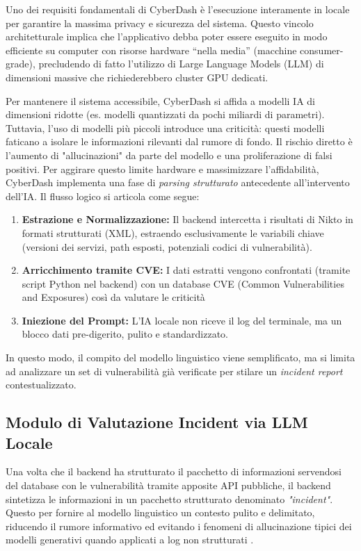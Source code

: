 \documentclass{article}
\begin{document}
Uno dei requisiti fondamentali di CyberDash è l'esecuzione interamente in locale per garantire la massima privacy e sicurezza del sistema. Questo vincolo architetturale implica che l'applicativo debba poter essere eseguito in modo efficiente su computer con risorse hardware ``nella media'' (macchine consumer-grade), precludendo di fatto l'utilizzo di Large Language Models (LLM) di dimensioni massive che richiederebbero cluster GPU dedicati.

Per mantenere il sistema accessibile, CyberDash si affida a modelli IA di dimensioni ridotte (es. modelli quantizzati da pochi miliardi di parametri). Tuttavia, l'uso di modelli più piccoli introduce una criticità: questi modelli faticano a isolare le informazioni rilevanti dal rumore di fondo. Il rischio diretto è l'aumento di "allucinazioni" da parte del modello e una proliferazione di falsi positivi.
Per aggirare questo limite hardware e massimizzare l'affidabilità, CyberDash implementa una fase di \textit{parsing strutturato} antecedente all'intervento dell'IA. Il flusso logico si articola come segue:

\begin{enumerate}
    \item \textbf{Estrazione e Normalizzazione:} Il backend intercetta i risultati di Nikto in formati strutturati (XML), estraendo esclusivamente le variabili chiave (versioni dei servizi, path esposti, potenziali codici di vulnerabilità).
    \item \textbf{Arricchimento tramite CVE:} I dati estratti vengono confrontati (tramite script Python nel backend) con un database CVE (Common Vulnerabilities and Exposures) così da valutare le criticità
    \item \textbf{Iniezione del Prompt:} L'IA locale non riceve il log del terminale, ma un blocco dati pre-digerito, pulito e standardizzato.
\end{enumerate}

In questo modo, il compito del modello linguistico viene semplificato, ma si limita ad analizzare un set di vulnerabilità già verificate per stilare un \textit{incident report} contestualizzato. 





\subsection{Modulo di Valutazione Incident via LLM Locale}
Una volta che il backend ha strutturato il pacchetto di informazioni servendosi del database con le vulnerabilità tramite apposite API pubbliche, il backend sintetizza le informazioni in un pacchetto strutturato denominato \textit{"incident"}. 
Questo per fornire al modello linguistico un contesto pulito e delimitato, riducendo il rumore informativo ed evitando i fenomeni di allucinazione tipici dei modelli generativi quando applicati a log non strutturati \cite{addis_llm-based_2026, wu_autopt_2025}.
\end{document}
